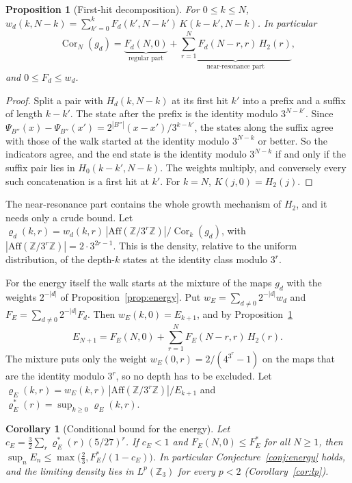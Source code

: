 \documentclass[12pt]{amsart}
\newtheorem{corollary}{Corollary}
\newtheorem{proposition}{Proposition}
\theoremstyle{definition}
\theoremstyle{remark}
\newcommand{\Z}{\mathbb{Z}}
\begin{document}
\begin{proposition}[First-hit decomposition]
\label{prop:renewal}
For $0\le k\le N$, $w_d(k,N-k)=\sum_{k'=0}^kF_d(k',N-k')\,K(k-k',N-k)$. In particular
\[
 \operatorname{Cor}_N(g_d)=\underbrace{F_d(N,0)}_{\text{regular part}}+\underbrace{\sum_{r=1}^NF_d(N-r,r)\,H_2(r)}_{\text{near-resonance part}},
\]
and $0\le F_d\le w_d$.
\end{proposition}

\begin{proof}
Split a pair with $H_d(k,N-k)$ at its first hit $k'$ into a prefix and a suffix of length $k-k'$. The state after the prefix is the identity modulo $3^{N-k'}$. Since $\Psi_{B''}(x)-\Psi_{B''}(x')=2^{|B''|}(x-x')/3^{k-k'}$, the states along the suffix agree with those of the walk started at the identity modulo $3^{N-k}$ or better. So the indicators agree, and the end state is the identity modulo $3^{N-k}$ if and only if the suffix pair lies in $H_0(k-k',N-k)$. The weights multiply, and conversely every such concatenation is a first hit at $k'$. For $k=N$, $K(j,0)=H_2(j)$.
\end{proof}

The near-resonance part contains the whole growth mechanism of $H_2$, and it needs only a crude bound. Let $\varrho_d(k,r)=w_d(k,r)\,|\mathrm{Aff}(\Z/3^r\Z)|/\operatorname{Cor}_k(g_d)$, with $|\mathrm{Aff}(\Z/3^r\Z)|=2\cdot3^{2r-1}$. This is the density, relative to the uniform distribution, of the depth-$k$ states at the identity class modulo $3^r$.

For the energy itself the walk starts at the mixture of the maps $g_d$ with the weights $2^{-|d|}$ of Proposition~\ref{prop:energy}. Put $w_E=\sum_{d\ne0}2^{-|d|}w_d$ and $F_E=\sum_{d\ne0}2^{-|d|}F_d$. Then $w_E(k,0)=E_{k+1}$, and by Proposition~\ref{prop:renewal}
\[
 E_{N+1}=F_E(N,0)+\sum_{r=1}^NF_E(N-r,r)\,H_2(r).
\]
The mixture puts only the weight $w_E(0,r)=2/(4^{3^r}-1)$ on the maps that are the identity modulo $3^r$, so no depth has to be excluded. Let $\varrho_E(k,r)=w_E(k,r)\,|\mathrm{Aff}(\Z/3^r\Z)|/E_{k+1}$ and $\varrho^*_E(r)=\sup_{k\ge0}\varrho_E(k,r)$.

\begin{corollary}[Conditional bound for the energy]
\label{cor:energy-bootstrap}
Let $c_E=\frac32\sum_r\varrho^*_E(r)(5/27)^r$. If $c_E<1$ and $F_E(N,0)\le F^*_E$ for all $N\ge1$, then $\sup_nE_n\le\max\bigl(\frac23,F^*_E/(1-c_E)\bigr)$. In particular Conjecture~\ref{conj:energy} holds, and the limiting density lies in $L^p(\Z_3)$ for every $p<2$ (Corollary~\ref{cor:lp}).
\end{corollary}
\end{document}
